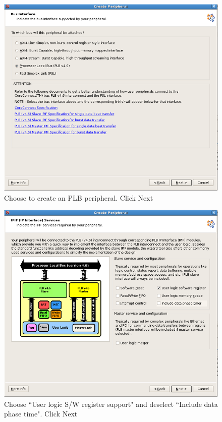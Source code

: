 \documentclass[a4paper,oneside]{memoir}
\begin{document}
\begin{figure}[H]
\centering
\includegraphics[scale=0.5]{step16}
\caption{Choose to create an PLB peripheral. Click Next\label{fig:step16}}
\end{figure}
\begin{figure}[H]
\centering
\includegraphics[scale=0.5]{step17}
\caption{Choose ``User logic S/W register support" and deselect ``Include data phase time". Click Next\label{fig:step17}}
\end{figure}
\end{document}

